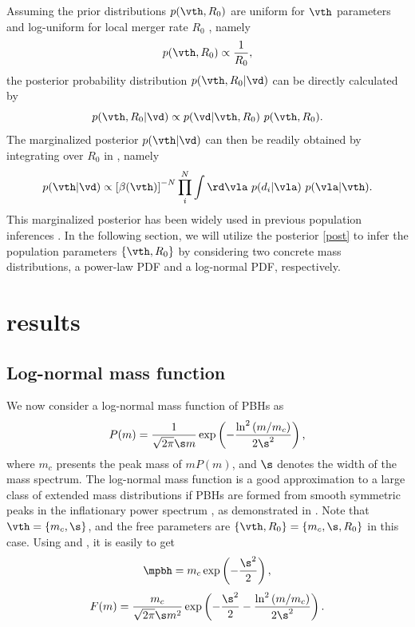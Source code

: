 \documentclass[twocolumn]{aastex631}
\def\({\left(}
\def\){\right)}
\def\[{\left[}
\def\]{\right]}
\def\e{\begin{equation}}
\def\q{\end{equation}}
\begin{document}
Assuming the prior distributions $p(\vth, R_0)$ are uniform for $\vth$ parameters
and log-uniform for local merger rate $R_0$
\cite{Abbott:2016nhf,Abbott:2017vtc}, namely
\e 
p(\vth, R_0) \propto \frac{1}{R_0},
\q 
the posterior probability distribution $p(\vth, R_0|\vd)$ 
can be directly calculated by
\e\label{post} 
p(\vth, R_0|\vd) \propto p(\vd |\vth, R_0)\ p(\vth, R_0).
\q
The marginalized posterior $p(\vth|\vd)$ can then be readily obtained by
integrating over $R_0$ in , namely
\e\label{post_vth} 
p(\vth|\vd) \propto \[\beta(\vth)\]^{-N} 
\prod_i^N \int \rd\vla\ p(d_i|\vla)\ p(\vla|\vth).
\q 
This marginalized posterior has been widely used in previous 
population inferences 
\cite{Abbott:2016nhf,Abbott:2017vtc,TheLIGOScientific:2016pea,
    Abbott:2016drs,Fishbach:2017zga,Chen:2018rzo}.
In the following section, we will utilize the posterior \eqref{post} to infer
the population parameters $\{\vth, R_0\}$ by considering two concrete mass
distributions, a power-law PDF and a log-normal PDF, respectively.

\section{\label{result}results}
\subsection{Log-normal mass function}
We now consider a log-normal mass function of PBHs as \cite{Dolgov:1992pu}
\e\label{log}
P(m) = \frac{1}{\sqrt{2\pi} \s m} \exp \(-\frac{\ln^2\(m/m_c\)}{2\s^2}\),
\q
where $m_c$ presents the peak mass of $m P(m)$, and $\s$ denotes the width of 
the mass spectrum.
The log-normal mass function is a good approximation to a large class of extended mass distributions if PBHs are formed from smooth symmetric peaks in the inflationary power spectrum \cite{Carr:2017jsz}, as demonstrated in \cite{Green:2016xgy,Kannike:2017bxn}.
Note that $\vth=\{m_c, \s\}$, and the free parameters are 
$\{\vth, R_0\} = \{m_c, \s, R_0\}$ in this case. 
Using  and , it is easily to get
\e
\mpbh = m_c \exp \(-\frac{\s^2}{2}\),
\q
\e 
F(m) = \frac{m_c}{\sqrt{2\pi} \s m^2} \exp \(-\frac{\s^2}{2}-\frac{\ln^2\(m/m_c\)}{2\s^2}\).
\q
\end{document}
